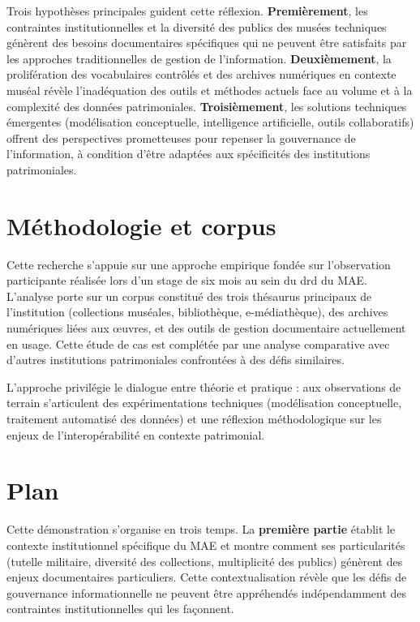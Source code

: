 Trois hypothèses principales guident cette réflexion. \textbf{Premièrement}, les contraintes institutionnelles et la diversité des publics des musées techniques génèrent des besoins documentaires spécifiques qui ne peuvent être satisfaits par les approches traditionnelles de gestion de l'information. \textbf{Deuxièmement}, la prolifération des vocabulaires contrôlés et des archives numériques en contexte muséal révèle l'inadéquation des outils et méthodes actuels face au volume et à la complexité des données patrimoniales. \textbf{Troisièmement}, les solutions techniques émergentes (modélisation conceptuelle, intelligence artificielle, outils collaboratifs) offrent des perspectives prometteuses pour repenser la gouvernance de l'information, à condition d'être adaptées aux spécificités des institutions patrimoniales.

\section*{Méthodologie et corpus}

Cette recherche s'appuie sur une approche empirique fondée sur l'observation participante réalisée lors d'un stage de six mois au sein du \ac{drd} du MAE. L'analyse porte sur un corpus constitué des trois thésaurus principaux de l'institution (collections muséales, bibliothèque, e-médiathèque), des archives numériques liées aux œuvres, et des outils de gestion documentaire actuellement en usage. Cette étude de cas est complétée par une analyse comparative avec d'autres institutions patrimoniales confrontées à des défis similaires.

L'approche privilégie le dialogue entre théorie et pratique : aux observations de terrain s'articulent des expérimentations techniques (modélisation conceptuelle, traitement automatisé des données) et une réflexion méthodologique sur les enjeux de l'interopérabilité en contexte patrimonial.

\section*{Plan}

Cette démonstration s'organise en trois temps. La \textbf{première partie} établit le contexte institutionnel spécifique du MAE et montre comment ses particularités (tutelle militaire, diversité des collections, multiplicité des publics) génèrent des enjeux documentaires particuliers. Cette contextualisation révèle que les défis de gouvernance informationnelle ne peuvent être appréhendés indépendamment des contraintes institutionnelles qui les façonnent.

